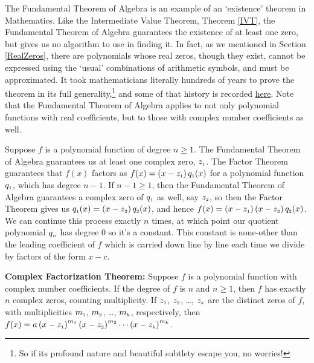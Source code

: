 \documentclass{ximera}
\begin{document}
The Fundamental Theorem of Algebra is an example of an `existence' theorem in Mathematics.  Like the Intermediate Value Theorem, Theorem \ref{IVT}, the Fundamental Theorem of Algebra  guarantees the existence of at least one zero, but gives us no algorithm to use in finding it.  In fact, as we mentioned in Section \ref{RealZeros}, there are polynomials whose real zeros, though they exist, cannot be expressed using the `usual' combinations of arithmetic symbols, and must be approximated.  It took mathematicians literally hundreds of years to prove the theorem in its full generality,\footnote{So if its profound nature and beautiful subtlety escape you, no worries!} and some of that history is recorded \href{http://en.wikipedia.org/wiki/Fundamental_theorem_of_algebra}{\underline{here}}.  Note that the Fundamental Theorem of Algebra  applies to not only polynomial functions with real coefficients, but to those with complex number coefficients as well.  



Suppose  $f$ is a polynomial function of degree $n \geq 1$.  The Fundamental Theorem of Algebra guarantees us at least one complex zero, $z_{\mbox{\tiny $1$}}$.  The Factor Theorem guarantees that $f(x)$ factors as $f(x) = \left(x - z_{\mbox{\tiny $1$}}\right) q_{\mbox{\tiny $1$}}(x)$ for a polynomial function $q_{\mbox{\tiny $1$}}$,  which has degree $n-1$.  If $n-1 \geq 1$, then the Fundamental Theorem of Algebra guarantees a complex zero of $q_{\mbox{\tiny $1$}}$ as well, say $z_{\mbox{\tiny $2$}}$, so then the Factor Theorem gives us $q_{\mbox{\tiny $1$}}(x) = \left(x - z_{\mbox{\tiny $2$}}\right) q_{\mbox{\tiny $2$}}(x)$, and hence $f(x) = \left(x - z_{\mbox{\tiny $1$}}\right) \left(x - z_{\mbox{\tiny $2$}}\right) q_{\mbox{\tiny $2$}}(x)$.  We can continue this process exactly $n$ times, at which point our quotient polynomial $q_{\mbox{\tiny $n$}}$ has degree $0$ so it's a constant.  This constant is none-other than the leading coefficient of $f$ which is carried down line by line each time we divide by factors of the form $x-c$.


\colorbox{ResultColor}{\bbm
\begin{thm} \label{complexfactorization} \textbf{Complex Factorization Theorem:} Suppose $f$ is a polynomial function with complex number coefficients.  If the degree of $f$ is $n$ and $n \geq 1$, then  $f$ has exactly $n$ complex zeros, counting multiplicity.  If $z_{\mbox{\tiny $1$}}$, $z_{\mbox{\tiny $2$}}$, \ldots, $z_{\mbox{\tiny $k$}}$ are the distinct zeros of $f$, with multiplicities $m_{\mbox{\tiny $1$}}$, $m_{\mbox{\tiny $2$}}$, \ldots, $m_{\mbox{\tiny $k$}}$, respectively, then $f(x) = a\left(x - z_{\mbox{\tiny $1$}}  \right)^{m_{\mbox{\tiny $1$}}}\left(x - z_{\mbox{\tiny $2$}}  \right)^{m_{\mbox{\tiny $2$}}} \cdots \left(x - z_{\mbox{\tiny $k$}}  \right)^{m_{\mbox{\tiny $k$}}}$. 

\end{thm}
\ebm}
\end{document}
